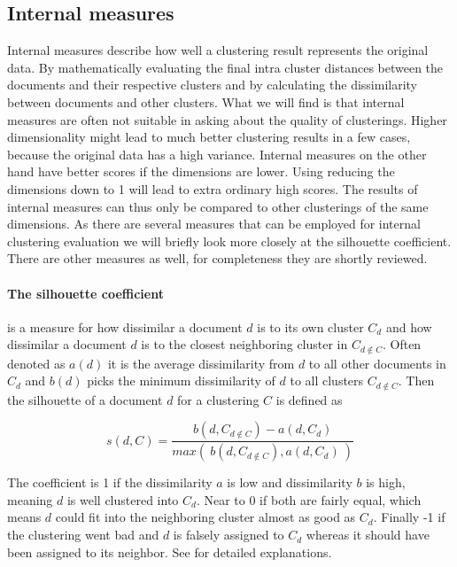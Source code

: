   \subsection{Internal measures}
  \label{sec:internal_measures}

    Internal measures describe how well a clustering result represents the original data. By mathematically evaluating the final intra cluster distances between the documents and their respective clusters and by calculating the dissimilarity between documents and other clusters. What we will find is that internal measures are often not suitable in asking about the quality of clusterings. Higher dimensionality might lead to much better clustering results in a few cases, because the original data has a high variance. Internal measures on the other hand have better scores if the dimensions are lower. Using \lsa{} reducing the dimensions down to 1 will lead to extra ordinary high scores. The results of internal measures can thus only be compared to other clusterings of the same dimensions. As there are several measures that can be employed for internal clustering evaluation we will briefly look more closely at the silhouette coefficient. There are other measures as well, for completeness they are shortly reviewed.

    \paragraph{The silhouette coefficient} is a measure for how dissimilar a document $d$ is to its own cluster $C_d$ and how dissimilar a document $d$ is to the closest neighboring cluster in $C_{d \not \in C}$. Often denoted as $a(d)$ it is the average dissimilarity from $d$ to all other documents in $C_d$ and $b(d)$ picks the minimum dissimilarity of $d$ to all clusters $C_{d \not \in C}$. Then the silhouette of a document $d$ for a clustering $C$ is defined as

      \begin{equation}
        s(d, C) = \frac{b(d, C_{d \not \in C}) - a(d, C_d)}{max(\:b(d, C_{d \not \in C}), a(d, C_d)\:)}
      \end{equation} 

    The coefficient is 1 if the dissimilarity $a$ is low and dissimilarity $b$ is high, meaning $d$ is well clustered into $C_d$. Near to 0 if both are fairly equal, which means $d$ could fit into the neighboring cluster almost as good as $C_d$. Finally -1 if the clustering went bad and $d$ is falsely assigned to $C_d$ whereas it should have been assigned to its neighbor. See \cite{Silhouettes1987} for detailed explanations.

